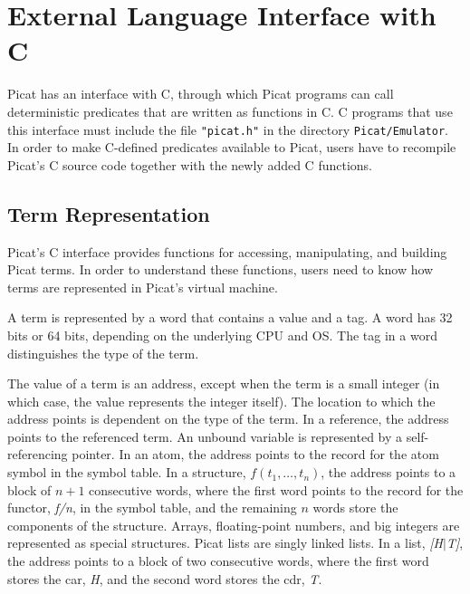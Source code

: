 \chapter{\label{ch:cinterface}External Language Interface with C}
Picat has an interface with C, through which Picat programs can call deterministic predicates that are written as functions in C. C programs that use this interface must include the file \texttt{"picat.h"} in the directory \texttt{Picat/Emulator}. In order to make C-defined predicates available to Picat, users have to recompile Picat's C source code together with the newly added C functions.


\section{Term Representation}
Picat's C interface provides functions for accessing, manipulating, and building Picat terms. In order to understand these functions, users need to know how terms are represented in Picat's virtual machine.

A term is represented by a word that contains a value and a tag. A word has 32 bits or 64 bits, depending on the underlying CPU and OS. The tag in a word distinguishes the type of the term. 

The value of a term is an address, except when the term is a small integer (in which case, the value represents the integer itself).  The location to which the address points is dependent on the type of the term.  In a reference, the address points to the referenced term. An unbound variable is represented by a self-referencing pointer. In an atom, the address points to the record for the atom symbol in the symbol table.  In a structure, $f(t_1, \ldots, t_n)$, the address points to a block of $n+1$ consecutive words, where the first word points to the record for the functor, \emph{f/n}, in the symbol table, and the remaining $n$ words store the components of the structure. Arrays, floating-point numbers, and big integers are represented as special structures. Picat lists are singly linked lists. In a list, \emph{[H$|$T]}, the address points to a block of two consecutive words, where the first word stores the car, \emph{H}, and the second word stores the cdr, \emph{T}. 

